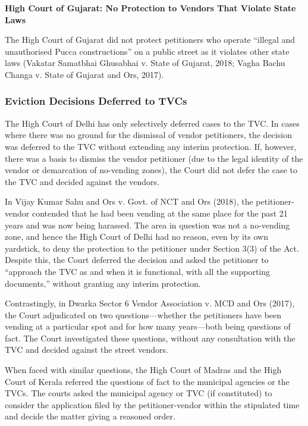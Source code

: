 \documentclass[a4paper, 12pt, twoside]{article}
\begin{document}
{\textbf{High Court of Gujarat: No Protection to Vendors That Violate State Laws} %

The High Court of Gujarat did not protect petitioners who operate “illegal and unauthorised Pucca constructions” on a public street as it violates other state laws (Vakatar Samatbhai Ghusabhai v. State of Gujarat, 2018; Vagha Bachu Changa v. State of Gujarat and Ors, 2017).

\subsubsection*{Eviction Decisions Deferred to TVCs}

The High Court of Delhi has only selectively deferred cases to the TVC. In cases where there was no ground for the dismissal of vendor petitioners, the decision was deferred to the TVC without extending any interim protection. If, however, there was a basis to dismiss the vendor petitioner (due to the legal identity of the vendor or demarcation of no-vending zones), the Court did not defer the case to the TVC and decided against the vendors.

In Vijay Kumar Sahu and Ors v. Govt. of NCT and Ors (2018), the petitioner-vendor contended that he had been vending at the same place for the past 21 years and was now being harassed. The area in question was not a no-vending zone, and hence the High Court of Delhi had no reason, even by its own yardstick, to deny the protection to the petitioner under Section 3(3) of the Act. Despite this, the Court deferred the decision and asked the petitioner to “approach the TVC as and when it is functional, with all the supporting documents,” without granting any interim protection.

Contrastingly, in Dwarka Sector 6 Vendor Association v. MCD and Ors (2017), the Court adjudicated on two questions—whether the petitioners have been vending at a particular spot and for how many years—both being questions of fact. The Court investigated these questions, without any consultation with the TVC and decided against the street vendors.

When faced with similar questions, the High Court of Madras and the High Court of Kerala referred the questions of fact to the municipal agencies or the TVCs. The courts asked the municipal agency or TVC (if constituted) to consider the application filed by the petitioner-vendor within the stipulated time and decide the matter giving a reasoned order.

}
\end{document}
